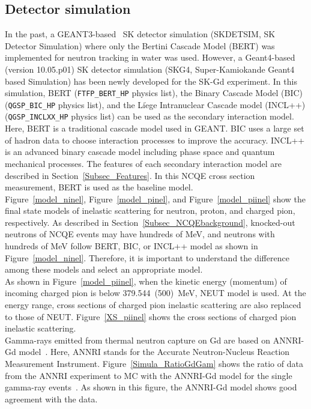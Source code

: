 \subsection{Detector simulation}
\vs\hs
In the past, a GEANT3-based~\cite{1994Brun} SK detector simulation (SKDETSIM, SK Detector Simulation) where only the Bertini Cascade Model (BERT) was implemented for neutron tracking in water was used.
However, a Geant4-based~\cite{2016Allison} (version 10.05.p01) SK detector simulation (SKG4, Super-Kamiokande Geant4 based Simulation) has been newly developed for the SK-Gd experiment.
In this simulation, BERT ({\tt \verb|FTFP_BERT_HP|} physics list), the Binary Cascade Model (BIC) ({\tt \verb|QGSP_BIC_HP|} physics list), and the Li$\grave{\text{e}}$ge Intranuclear Cascade model (INCL++) ({\tt \verb|QGSP_INCLXX_HP|} physics list) can be used as the secondary interaction model.
Here, BERT is a traditional cascade model used in GEANT.
BIC uses a large set of hadron data to choose interaction processes to improve the accuracy.
INCL++ is an advanced binary cascade model including phase space and quantum mechanical processes.
The features of each secondary interaction model are described in Section~\ref{Subsec_Features}.
In this NCQE cross section measurement, BERT is used as the baseline model.\\
\hs
Figure~\ref{model_ninel}, Figure~\ref{model_pinel}, and Figure~\ref{model_piinel} show the final state models of inelastic scattering for neutron, proton, and charged pion, respectively.
As described in Section~\ref{Subsec_NCQEbackground}, knocked-out neutrons of NCQE events may have hundreds of MeV, and neutrons with hundreds of MeV follow BERT, BIC, or INCL++ model as shown in Figure~\ref{model_ninel}.
Therefore, it is important to understand the difference among these models and select an appropriate model.\\
\hs
As shown in Figure~\ref{model_piinel}, when the kinetic energy (momentum) of incoming charged pion is below 379.544~(500)~MeV, NEUT model is used.
At the energy range, cross sections of charged pion inelastic scattering are also replaced to those of NEUT.
Figure~\ref{XS_piinel} shows the cross sections of charged pion inelastic scattering.\\
\hs
Gamma-rays emitted from thermal neutron capture on Gd are based on ANNRI-Gd model~\cite{2020Tanaka}.
Here, ANNRI stands for the Accurate Neutron-Nucleus Reaction Measurement Instrument.
Figure~\ref{Simula_RatioGdGam} shows the ratio of data from the ANNRI experiment to MC with the ANNRI-Gd model for the single gamma-ray events~\cite{2020Tanaka}.
As shown in this figure, the ANNRI-Gd model shows good agreement with the data.

